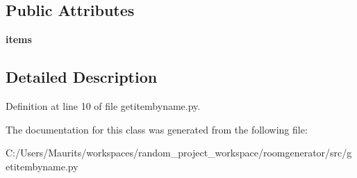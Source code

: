 \subsection*{Public Attributes}
\begin{DoxyCompactItemize}
\item 
\hypertarget{classgetitembyname_1_1_item_store_aebdae66ea7cef67c9105af69483c886b}{}{\bfseries items}\label{classgetitembyname_1_1_item_store_aebdae66ea7cef67c9105af69483c886b}

\end{DoxyCompactItemize}


\subsection{Detailed Description}


Definition at line 10 of file getitembyname.\+py.



The documentation for this class was generated from the following file\+:\begin{DoxyCompactItemize}
\item 
C\+:/\+Users/\+Maurits/workspaces/random\+\_\+project\+\_\+workspace/roomgenerator/src/getitembyname.\+py\end{DoxyCompactItemize}
